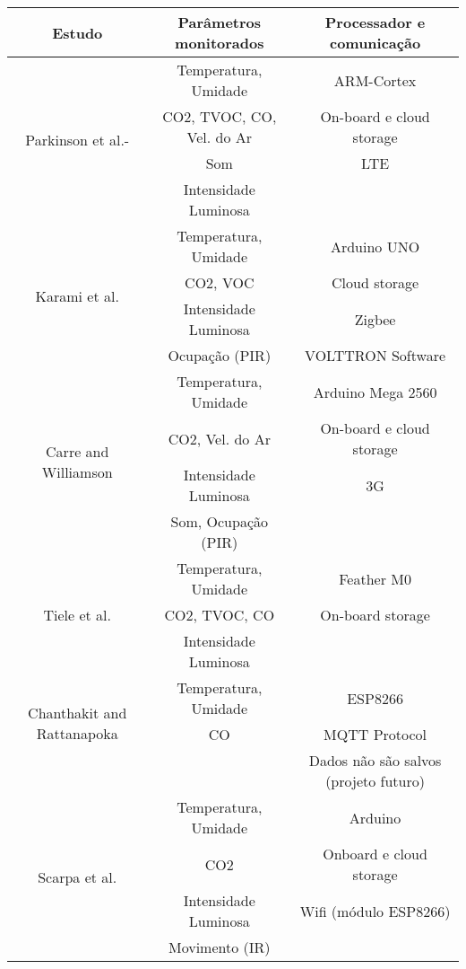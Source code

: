 \documentclass[../monografia.tex]{subfiles}
\begin{document}
\begin{center}
\begin{longtable}{ |c|c|c| } 
\hline %
\textbf{Estudo} & \textbf{Parâmetros monitorados} & \textbf{Processador e comunicação} \\ 
\hline %
\multirow{4}{8em}{Parkinson et al.\cite{PARKINSON201915}-\cite{PARKINSON2019241}} & Temperatura, Umidade & ARM-Cortex \\
& CO2, TVOC, CO, Vel. do Ar & On-board e cloud storage \\ 
& Som & LTE \\ 
& Intensidade Luminosa  &  \\ 
\hline %
\multirow{4}{8em}{Karami et al.\cite{KARAMI2018412}} & Temperatura, Umidade & Arduino UNO \\ 
& CO2, VOC & Cloud storage \\ 
& Intensidade Luminosa & Zigbee \\ 
& Ocupação (PIR)  & VOLTTRON Software \\ 
\hline %
\multirow{4}{8em}{Carre and Williamson\cite{CARRE20181751}} & Temperatura, Umidade & Arduino Mega 2560 \\ 
& CO2, Vel. do Ar & On-board e cloud storage \\ 
& Intensidade Luminosa & 3G \\ 
& Som, Ocupação (PIR)  &  \\ 
\hline %
\multirow{3}{8em}{Tiele et al.\cite{Tiele2018}} & Temperatura, Umidade & Feather M0 \\ 
& CO2, TVOC, CO & On-board storage \\ 
& Intensidade Luminosa &  \\ 
\hline %
\multirow{3}{8em}{Chanthakit and Rattanapoka\cite{Chanthakit2018}} & Temperatura, Umidade & ESP8266 \\  %
& CO & MQTT Protocol \\ 
&  & \multirow{2}{12em}{Dados não são salvos (projeto futuro)} \\ 
& & \\
\hline %
\multirow{4}{8em}{Scarpa et al.\cite{SCARPA2017282}} & Temperatura, Umidade & Arduino \\ 
& CO2 & Onboard e cloud storage \\ 
& Intensidade Luminosa & Wifi (módulo ESP8266) \\ 
& Movimento (IR)  &\\
\hline %

\end{longtable}
\end{center}
\end{document}
